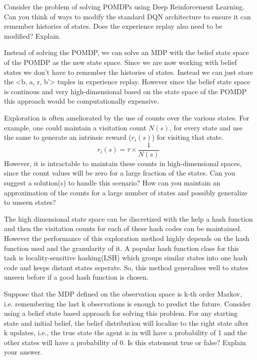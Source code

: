 \documentclass[solution,addpoints,12pt]{exam}
\begin{document}
\begin{questions}
\question[3] Consider the problem of solving POMDPs using Deep Reinforcement Learning. Can you think of ways to modify the standard DQN architecture to ensure it can remember histories of states. Does the experience replay also need to be modified? Explain.

\begin{solution}
Instead of solving the POMDP, we can solve an MDP with the belief state space of the POMDP as the new state space. Since we are now working with belief states we don't have to remember the histories of states. Instead we can just store the <b, a, r, b'> tuples in experience replay. However since the belief state space is continous and very high-dimensional based on the state space of the POMDP this approach would be computationally expensive. 
\end{solution}


\question[4] Exploration is often ameliorated by the use of counts over the various states. For example, one could maintain a visitation count $N(s)$, for every state and use the same to generate an intrinsic reward ($r_i(s)$) for visiting that state.
\[ r_i(s) = \tau \times \frac{1}{N(s)} \]
However, it is intractable to maintain these counts in high-dimensional spaces, since the count values will be zero for a large fraction of the states. Can you suggest a solution(s) to handle this scenario? How can you maintain an approximation of the counts for a large number of states and possibly generalize to unseen states?

\begin{solution}
The high dimensional state space can be discretized with the help a hash function and then the visitation counts for each of these hash codes can be maintained. \\
However the performance of this exploration method highly depends on the hash function used and the granularity of it. A popular hash function class for this task is locality-sensitive hashing(LSH) which groups similar states into one hash code and keeps distant states seperate. So, this method generalises well to states unseen before if a good hash function is chosen. 
\end{solution}

\question[5] Suppose that the MDP defined on the observation space is k-th order Markov, i.e. remembering the last k observations is enough to predict the future. 
Consider using a belief state based approach for solving this problem. For any starting state and initial belief, the belief distribution will localize to the right state after k updates, i.e., the true state the agent is in will have a probability of 1 and the other states will have a probability of 0. Is this statement true or false? Explain your answer. 


\end{questions}
\end{document}
